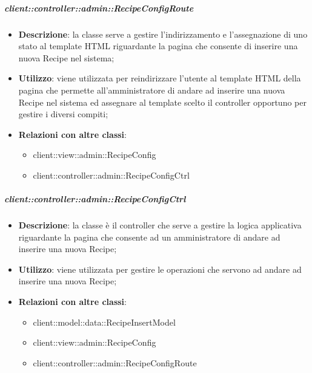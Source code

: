 		\subparagraph{client::controller::admin::RecipeConfigRoute} %
		\label{subp:bdsm_app_client_controller_admin_recipeconfigroute}
			\begin{itemize}
				\item \textbf{Descrizione}: la classe serve a gestire l'indirizzamento e l'assegnazione di uno stato al template HTML riguardante la pagina che consente di inserire una nuova Recipe nel sistema;
				\item \textbf{Utilizzo}: viene utilizzata per reindirizzare l'utente al template HTML della pagina che permette all'amministratore di andare ad inserire una nuova Recipe nel sistema ed assegnare al template scelto il controller opportuno per gestire i diversi compiti;
				\item \textbf{Relazioni con altre classi}:
					\begin{itemize}
						\item client::view::admin::RecipeConfig
						\item client::controller::admin::RecipeConfigCtrl
					\end{itemize}
			\end{itemize}

		\subparagraph{client::controller::admin::RecipeConfigCtrl} %
		\label{subp:bdsm_app_client_controller_admin_recipeconfigctrl}
			\begin{itemize}
				\item \textbf{Descrizione}: la classe è il controller che serve a gestire la logica applicativa riguardante la pagina che consente ad un amministratore di andare ad inserire una nuova Recipe;
				\item \textbf{Utilizzo}: viene utilizzata per gestire le operazioni che servono ad andare ad inserire una nuova Recipe;
				\item \textbf{Relazioni con altre classi}:
					\begin{itemize}
						\item client::model::data::RecipeInsertModel
						\item client::view::admin::RecipeConfig
						\item client::controller::admin::RecipeConfigRoute
					\end{itemize}
			\end{itemize}

